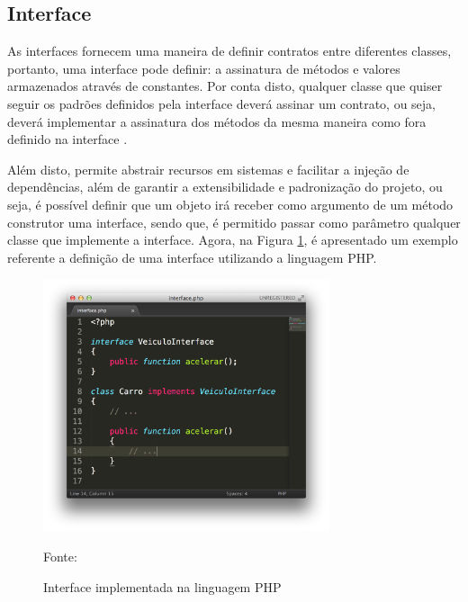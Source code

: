 \subsection{Interface}

As interfaces fornecem uma maneira de definir contratos entre diferentes
classes, portanto, uma interface pode definir: a assinatura de métodos e
valores armazenados através de constantes. Por conta disto, qualquer classe  que
quiser seguir os padrões definidos pela interface deverá assinar um contrato,
ou seja, deverá implementar a assinatura dos métodos da mesma maneira como  fora
definido na interface \cite{programmingPhp}.

Além disto, permite abstrair recursos em sistemas e facilitar a
injeção de dependências, além de garantir a extensibilidade e padronização do
projeto, ou seja, é possível definir que um objeto irá receber como argumento de
um método construtor uma interface, sendo que, é permitido passar como parâmetro
qualquer classe que implemente a interface. Agora, na Figura
\ref{fig:interface}, é apresentado um exemplo referente a definição de uma 
interface utilizando a linguagem \acs{PHP}.

\begin{figure}[h!tb]
	\caption{Interface implementada na linguagem PHP}
	\label{fig:interface}

	\centering
	\includegraphics[width=0.75\textwidth]{images/interface.png}

	\centering
	\footnotesize Fonte: \fonteOAutor
\end{figure}

\FloatBarrier 	%


